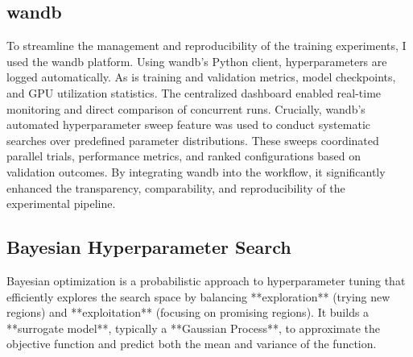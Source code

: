 
\subsection{\acrfull{wandb}}
\label{ssec:wandb}
To streamline the management and reproducibility of the training experiments, I used the \acrlong{wandb} platform. Using \acrshort{wandb}'s Python client, hyperparameters are logged automatically. As is training and validation metrics, model checkpoints, and GPU utilization statistics. The centralized dashboard enabled real-time monitoring and direct comparison of concurrent runs. Crucially, \acrshort{wandb}'s automated hyperparameter sweep feature was used to conduct systematic searches over predefined parameter distributions. These sweeps coordinated parallel trials, performance metrics, and ranked configurations based on validation outcomes. By integrating \acrshort{wandb} into the workflow, it significantly enhanced the transparency, comparability, and reproducibility of the experimental pipeline.

\subsection{Bayesian Hyperparameter Search}

Bayesian optimization is a probabilistic approach to hyperparameter tuning that efficiently explores the search space by balancing **exploration** (trying new regions) and **exploitation** (focusing on promising regions). It builds a **surrogate model**, typically a **Gaussian Process**, to approximate the objective function and predict both the mean and variance of the function.

